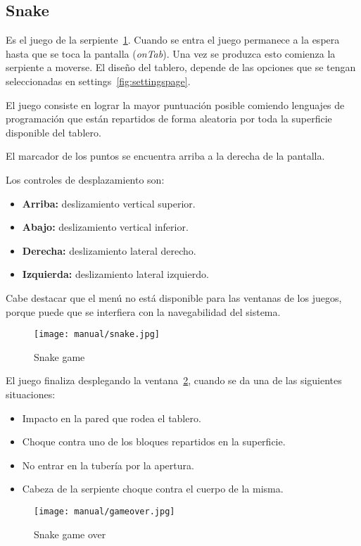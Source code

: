 \subsection{Snake}\label{snake}
Es el juego de la serpiente~\ref{fig:snakepage}. Cuando se entra el juego permanece a la espera hasta que se toca la pantalla (\emph{onTab}). Una vez se produzca esto comienza la serpiente a moverse. El diseño del tablero, depende de las opciones que se tengan seleccionadas en settings~\ref{fig:settingspage}.

El juego consiste en lograr la mayor puntuación posible comiendo lenguajes de programación que están repartidos de forma aleatoria por toda la superficie disponible del tablero.

El marcador de los puntos se encuentra arriba a la derecha de la pantalla.

Los controles de desplazamiento son:
\begin{itemize}
	\item \textbf{Arriba:} deslizamiento vertical superior.
	\item \textbf{Abajo:} deslizamiento vertical inferior.
	\item \textbf{Derecha:} deslizamiento lateral derecho.
	\item \textbf{Izquierda:} deslizamiento lateral izquierdo.
\end{itemize}

Cabe destacar que el menú no está disponible para las ventanas de los juegos, porque puede que se interfiera con la navegabilidad del sistema.

\begin{figure}[H]
	\centering
	\texttt{[image: manual/snake.jpg]}
	\caption{Snake game}\label{fig:snakepage}
\end{figure}

El juego finaliza desplegando la ventana~\ref{fig:gameover}, cuando se da una de las siguientes situaciones:
\begin{itemize}
	\item Impacto en la pared que rodea el tablero.
	\item Choque contra uno de los bloques repartidos en la superficie.
	\item No entrar en la tubería por la apertura.
	\item Cabeza de la serpiente choque contra el cuerpo de la misma.
\end{itemize}

\begin{figure}[H]
	\centering
	\texttt{[image: manual/gameover.jpg]}
	\caption{Snake game over}\label{fig:gameover}
\end{figure}

